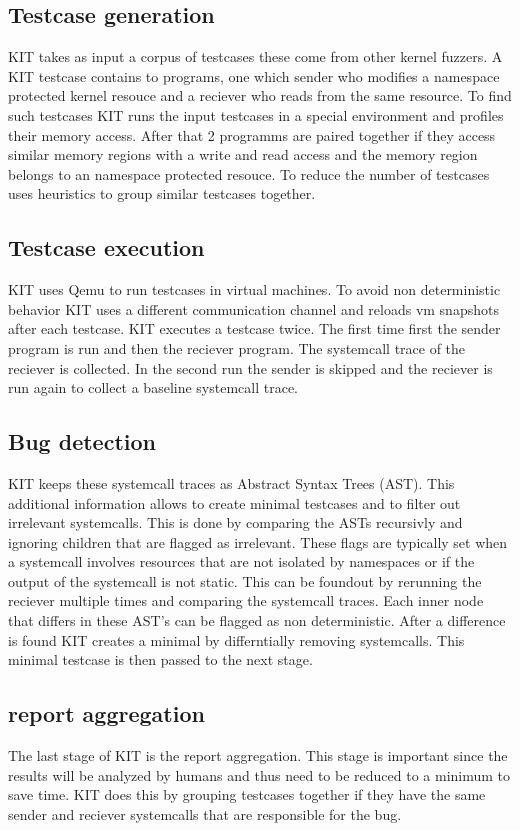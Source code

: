 \documentclass[10pt,twocolumn,a4paper]{article}
\begin{document}
\subsection{Testcase generation}
KIT takes as input a corpus of testcases these come from other kernel fuzzers.
A KIT testcase contains to programs, one which sender who modifies a namespace protected kernel
resouce and a reciever who reads from the same resource. To find such testcases
KIT runs the input testcases in a special environment and profiles their memory access. 
After that 2 programms are paired together if they access similar memory regions with a write and
read access and the memory region belongs to an namespace protected resouce.
To reduce the number of testcases uses heuristics to group similar testcases together.


\subsection{Testcase execution}
KIT uses Qemu to run testcases in virtual machines. To avoid non deterministic behavior KIT uses
a different communication channel and reloads vm snapshots after each testcase. KIT executes a
testcase twice. The first time first the sender program is run and then the reciever program. The
systemcall trace of the reciever is collected. In the second run the sender is skipped and the reciever
is run again to collect a baseline systemcall trace. 
\subsection{Bug detection}
KIT keeps these systemcall traces as Abstract Syntax Trees (AST). This additional information allows 
to create minimal testcases and to filter out irrelevant systemcalls. This is done by comparing the ASTs
recursivly and ignoring children that are flagged as irrelevant. These flags are typically set when
a systemcall involves resources that are not isolated by namespaces or if the output of the
systemcall is not static. This can be foundout by rerunning the reciever multiple times and
comparing the systemcall traces. Each inner node that differs in these AST's can be flagged as non
deterministic.
After a difference is found KIT creates a minimal by differntially removing systemcalls. This
minimal testcase is then passed to the next stage.
\subsection{report aggregation}
The last stage of KIT is the report aggregation. This stage is important since the results will be
analyzed by humans and thus need to be reduced to a minimum to save time. KIT does this by grouping
testcases together if they have the same sender and reciever systemcalls that are responsible for
the bug. 
\end{document}
